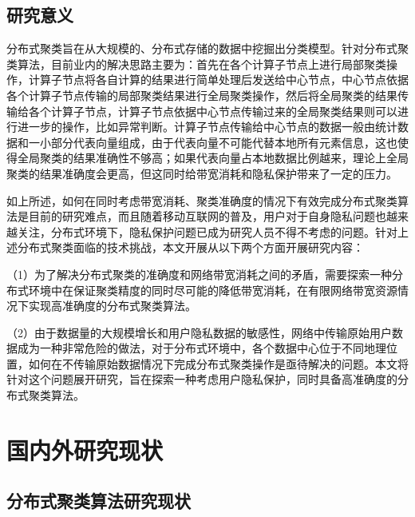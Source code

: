 \subsection{研究意义}
分布式聚类旨在从大规模的、分布式存储的数据中挖掘出分类模型。针对分布式聚类算法，目前业内的解决思路主要为：首先在各个计算子节点上进行局部聚类操作，计算子节点将各自计算的结果进行简单处理后发送给中心节点，中心节点依据各个计算子节点传输的局部聚类结果进行全局聚类操作，然后将全局聚类的结果传输给各个计算子节点，计算子节点依据中心节点传输过来的全局聚类结果则可以进行进一步的操作，比如异常判断。计算子节点传输给中心节点的数据一般由统计数据和一小部分代表向量组成，由于代表向量不可能代替本地所有元素信息，这也使得全局聚类的结果准确性不够高；如果代表向量占本地数据比例越来，理论上全局聚类的结果准确度会更高，但这同时给带宽消耗和隐私保护带来了一定的压力。

如上所述，如何在同时考虑带宽消耗、聚类准确度的情况下有效完成分布式聚类算法是目前的研究难点，而且随着移动互联网的普及，用户对于自身隐私问题也越来越关注，分布式环境下，隐私保护问题已成为研究人员不得不考虑的问题。针对上述分布式聚类面临的技术挑战，本文开展从以下两个方面开展研究内容：

（1）为了解决分布式聚类的准确度和网络带宽消耗之间的矛盾，需要探索一种分布式环境中在保证聚类精度的同时尽可能的降低带宽消耗，在有限网络带宽资源情况下实现高准确度的分布式聚类算法。

（2）由于数据量的大规模增长和用户隐私数据的敏感性，网络中传输原始用户数据成为一种非常危险的做法，对于分布式环境中，各个数据中心位于不同地理位置，如何在不传输原始数据情况下完成分布式聚类操作是亟待解决的问题。本文将针对这个问题展开研究，旨在探索一种考虑用户隐私保护，同时具备高准确度的分布式聚类算法。

\section{国内外研究现状}

\subsection{分布式聚类算法研究现状}

